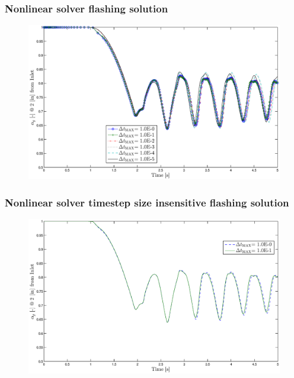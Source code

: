 \documentclass[compress,xcolor=table]{beamer}
\begin{document}
\begin{frame}
\frametitle{Nonlinear solver flashing solution}

\begin{figure}[h!t]
\centering
\includegraphics[width=.94\textwidth]{images/nl_flashing_al_2in.eps}
\end{figure}

\end{frame}
\begin{frame}
\frametitle{Nonlinear solver timestep size insensitive flashing solution}

\begin{figure}[h!t]
\centering
\includegraphics[width=.94\textwidth]{images/nl_flashing_1em0_1em1.eps}
\end{figure}

\end{frame}
\end{document}
